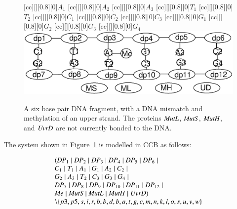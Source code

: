\begin{figure}[h!]
[cc][][0.8][0]{$A_1$}
[cc][][0.8][0]{$A_2$}
[cc][][0.8][0]{$A_3$}
[cc][][0.8][0]{$T_1$}
[cc][][0.8][0]{$T_2$}
[cc][][0.8][0]{$C_1$}
[cc][][0.8][0]{$C_2$}
[cc][][0.8][0]{$C_3$}
[cc][][0.8][0]{$G_1$}
[cc][][0.8][0]{$G_2$}
[cc][][0.8][0]{$G_3$}
[cc][][0.8][0]{$G_4$}
  \centering
    \includegraphics[width=1.0\textwidth]{mmr/state1}
  \caption[A six base pair DNA fragment.]{A six base pair DNA fragment, with a DNA mismatch and methylation of an upper strand. The proteins $\mathit{MutL}$, $\mathit{MutS}$, $\mathit{MutH}$, and $\mathit{UvrD}$ are not currently bonded to the DNA.}
  \label{fig:state1}
\end{figure}

The system shown in Figure~\ref{fig:state1} is modelled in CCB as follows:

$$\begin{array}{l}
(\mathit{DP}_1 \; \vert \; \mathit{DP}_2 \; \vert \; \mathit{DP}_3 \; \vert \; \mathit{DP}_4 \; \vert \; \mathit{DP}_5 \; \vert \; \mathit{DP}_6 \; \vert \; \\
C_1 \; \vert \; T_1 \; \vert \; A_1 \; \vert \; G_1 \; \vert \; A_2 \; \vert \; C_2 \; \vert \; \\
G_2 \; \vert \; A_3 \; \vert \; T_2 \; \vert \; C_3 \; \vert \; G_3 \; \vert \; G_4 \; \vert \; \\
\mathit{DP}_7 \; \vert \; \mathit{DP}_8 \; \vert \; \mathit{DP}_9 \; \vert \; \mathit{DP}_{10} \; \vert \; \mathit{DP}_{11} \; \vert \; \mathit{DP}_{12} \; \vert \; \\
\mathit{Me} \; \vert \; \mathit{MutS} \; \vert \; \mathit{MutL} \; \vert \; \mathit{MutH} \; \vert \; \mathit{UvrD}) \\
\setminus\{p3, p5, s, i, r, b, b, d, b, a, t, g, c, m, n, k, l, o, s, u, v, w\}
\end{array}$$

